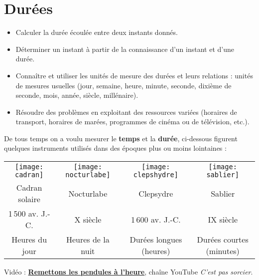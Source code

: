 \themaM
\graphicspath{{../Ch14_Durees_et_masses/Images/}}

\chapter{Durées}
\label{C22}


\begin{prerequis}
   \begin{itemize}
      \item Calculer la durée écoulée entre deux instants donnés.
      \item Déterminer un instant à partir de la connaissance d’un instant et d’une durée.
      \item Connaître et utiliser les unités de mesure des durées et leurs relations : unités de mesures usuelles (jour, semaine, heure, minute, seconde, dixième de seconde, mois, année, siècle, millénaire).
      \item Résoudre des problèmes en exploitant des ressources variées (horaires de transport, horaires de marées, programmes de cinéma ou de télévision, etc.).
   \end{itemize}
\end{prerequis}

\vfill

\begin{debat}
   De tous temps on a voulu mesurer le {\bf temps} et la {\bf durée}, ci-dessous figurent quelques instruments utilisés dans des époques plus ou moins lointaines : \\
   \textcolor{B1}{\small
   \begin{tabular}{*{4}{C{3.5}}}
      \texttt{[image: cadran]}
      &
      \texttt{[image: nocturlabe]}
      &
      \texttt{[image: clepshydre]}
      &
      \texttt{[image: sablier]} \\
      Cadran solaire & Nocturlabe & Clepsydre & Sablier \\
      1\,500 av. J.-C. & X siècle & 1\,600 av. J.-C. & IX siècle \\
      Heures du jour & Heures de la nuit & Durées longues (heures) & Durées courtes (minutes) \\
   \end{tabular}}
   \bigskip
   \begin{cadre}[B2][F4]
      \begin{center}
         Vidéo : \href{https://www.youtube.com/watch?v=8vMTE9U9z0U}{\bf Remettons les pendules à l'heure}, chaîne YouTube {\it C'est pas sorcier}.
      \end{center}
   \end{cadre}
\end{debat}

